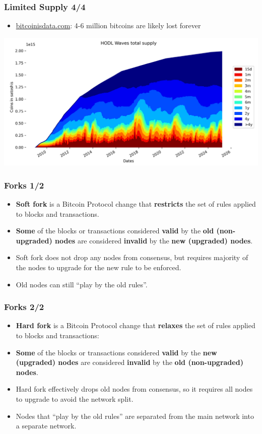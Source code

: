 \documentclass{beamer}
\begin{document}
\begin{frame}
  \frametitle{Limited Supply 4/4}
  \begin{itemize}
  \item \href{https://bitcoinisdata.com}{bitcoinisdata.com}: 4-6 million
    bitcoins are likely lost forever
  \end{itemize}
  \includegraphics[width=\textwidth]{utxo-age}
\end{frame}

\begin{frame}
  \frametitle{Forks 1/2}
  \begin{itemize}
  \item \textbf{Soft fork} is a Bitcoin Protocol change that \textbf{restricts}
    the set of rules applied to blocks and transactions.
  \item \textbf{Some} of the blocks or transactions considered \textbf{valid} by
    the \textbf{old (non-upgraded) nodes} are considered \textbf{invalid} by the
    \textbf{new (upgraded) nodes}.
  \item Soft fork does not drop any nodes from consensus, but requires majority
    of the nodes to upgrade for the new rule to be enforced.
  \item Old nodes can still ``play by the old rules''.
  \end{itemize}
\end{frame}

\begin{frame}
  \frametitle{Forks 2/2}
  \begin{itemize}
  \item \textbf{Hard fork} is a Bitcoin Protocol change that \textbf{relaxes}
    the set of rules applied to blocks and transactions:
  \item \textbf{Some} of the blocks or transactions considered \textbf{valid} by
    the \textbf{new (upgraded) nodes} are considered \textbf{invalid} by the
    \textbf{old (non-upgraded) nodes}.
  \item Hard fork effectively drops old nodes from consensus, so it requires all
    nodes to upgrade to avoid the network split.
  \item Nodes that ``play by the old rules'' are separated from the main network
    into a separate network.
  \end{itemize}
\end{frame}
\end{document}
